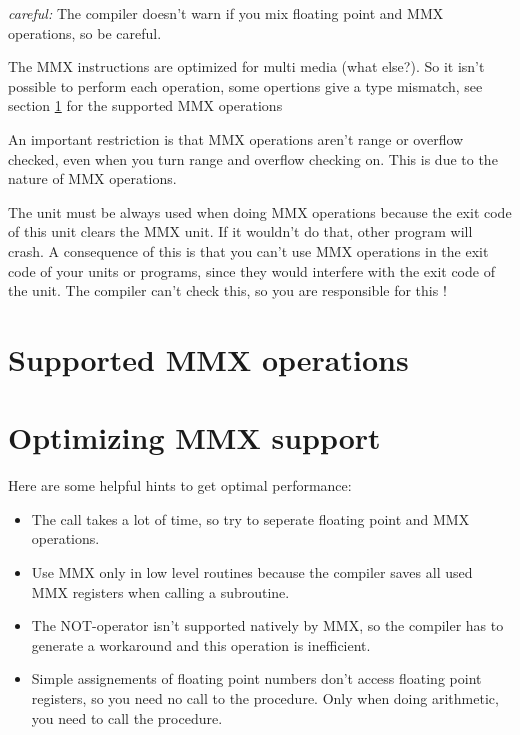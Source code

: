 \documentclass{report}
\begin{document}
{\em careful:} The compiler doesn't warn if you mix floating point and
MMX operations, so be careful.

The MMX instructions are optimized for multi media (what else?).
So it isn't possible to perform each operation, some opertions
give a type mismatch, see section \ref {se:SupportedMMX} for the supported
MMX operations

An important restriction is that MMX operations aren't range or overflow
checked, even when you turn range and overflow checking on. This is due to
the nature of MMX operations.

The  unit must be always used when doing MMX operations
because the exit code of this unit clears the MMX unit. If it wouldn't do
that, other program will crash. A consequence of this is that you can't use
MMX operations in the exit code of your units or programs, since they would
interfere  with the exit code of the  unit. The compiler can't
check this, so you are responsible for this !

\section{Supported MMX operations}
\label{se:SupportedMMX}



\section{Optimizing MMX support}
\label{se:OptimizingMMX}
Here are some helpful hints to get optimal performance:
\begin{itemize}
\item The  call takes a lot of time, so try to seperate floating
point and MMX operations.
\item Use MMX only in low level routines because the compiler
  saves all used MMX registers when calling a subroutine.
\item The NOT-operator isn't supported natively by MMX, so the
  compiler has to generate a workaround and this operation
  is inefficient.
\item Simple assignements of floating point numbers don't access
  floating point registers, so you need no call to the 
  procedure. Only when doing arithmetic, you need to call the 
procedure.
\end{itemize}


\end{document}
